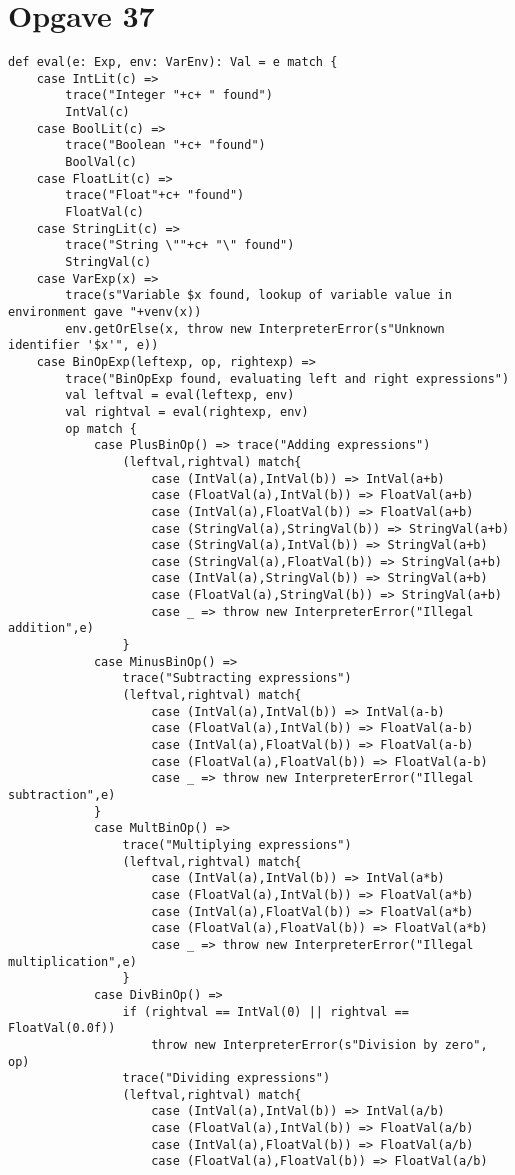 \documentclass[a4paper, 10pt]{article}
\begin{document}
\section*{Opgave 37}
\begin{lstlisting}
def eval(e: Exp, env: VarEnv): Val = e match {
	case IntLit(c) =>
		trace("Integer "+c+ " found")
		IntVal(c)
	case BoolLit(c) =>
		trace("Boolean "+c+ "found")
		BoolVal(c)
	case FloatLit(c) =>
		trace("Float"+c+ "found")
		FloatVal(c)
	case StringLit(c) =>
		trace("String \""+c+ "\" found")
		StringVal(c)
	case VarExp(x) =>
		trace(s"Variable $x found, lookup of variable value in environment gave "+venv(x))
		env.getOrElse(x, throw new InterpreterError(s"Unknown identifier '$x'", e))
	case BinOpExp(leftexp, op, rightexp) =>
		trace("BinOpExp found, evaluating left and right expressions")
		val leftval = eval(leftexp, env)
		val rightval = eval(rightexp, env)
		op match {
			case PlusBinOp() => trace("Adding expressions")
				(leftval,rightval) match{
					case (IntVal(a),IntVal(b)) => IntVal(a+b)
					case (FloatVal(a),IntVal(b)) => FloatVal(a+b)
					case (IntVal(a),FloatVal(b)) => FloatVal(a+b)
					case (StringVal(a),StringVal(b)) => StringVal(a+b)
					case (StringVal(a),IntVal(b)) => StringVal(a+b)
					case (StringVal(a),FloatVal(b)) => StringVal(a+b)
					case (IntVal(a),StringVal(b)) => StringVal(a+b)
					case (FloatVal(a),StringVal(b)) => StringVal(a+b)
					case _ => throw new InterpreterError("Illegal addition",e)
				}
			case MinusBinOp() =>
				trace("Subtracting expressions")
				(leftval,rightval) match{
					case (IntVal(a),IntVal(b)) => IntVal(a-b)
					case (FloatVal(a),IntVal(b)) => FloatVal(a-b)
					case (IntVal(a),FloatVal(b)) => FloatVal(a-b)
					case (FloatVal(a),FloatVal(b)) => FloatVal(a-b)
					case _ => throw new InterpreterError("Illegal subtraction",e)
			}
			case MultBinOp() =>
				trace("Multiplying expressions")
				(leftval,rightval) match{
					case (IntVal(a),IntVal(b)) => IntVal(a*b)
					case (FloatVal(a),IntVal(b)) => FloatVal(a*b)
					case (IntVal(a),FloatVal(b)) => FloatVal(a*b)
					case (FloatVal(a),FloatVal(b)) => FloatVal(a*b)
					case _ => throw new InterpreterError("Illegal multiplication",e)
				}
			case DivBinOp() =>
				if (rightval == IntVal(0) || rightval == FloatVal(0.0f))
					throw new InterpreterError(s"Division by zero", op)
				trace("Dividing expressions")
				(leftval,rightval) match{
					case (IntVal(a),IntVal(b)) => IntVal(a/b)
					case (FloatVal(a),IntVal(b)) => FloatVal(a/b)
					case (IntVal(a),FloatVal(b)) => FloatVal(a/b)
					case (FloatVal(a),FloatVal(b)) => FloatVal(a/b)

\end{lstlisting}
\end{document}
